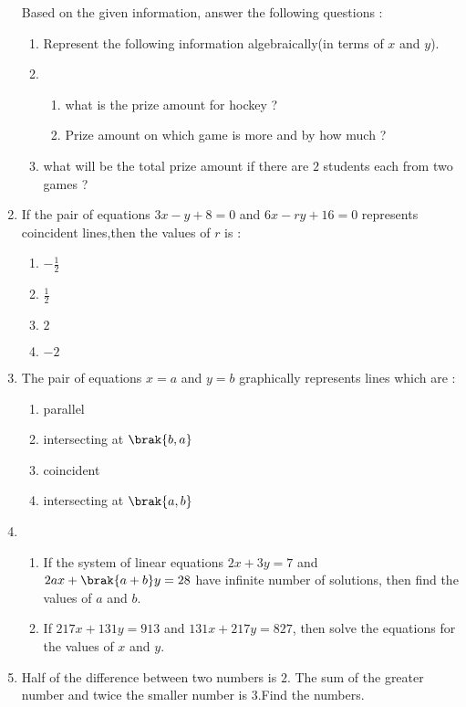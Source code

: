 \begin{enumerate}
Based on the given information, answer the following questions :
\begin{enumerate}[label=(\roman*)]
    \item Represent the following information algebraically(in terms of $x$ and $y$).
    \item\begin{enumerate}[label=(\alph*)]
\item what is the prize amount for hockey ?
\item Prize amount on which game is more and by how much ?
    \end{enumerate}
    \item what will be the total prize amount if there are $2$ students each from two games ?
\end{enumerate}
\item If the pair of equations $3x - y + 8 = 0$ and $6x - ry +16 =0$ represents coincident lines,then the values of $r$ is :
\begin{enumerate}[label=(\alph*)]
    \item $-\frac{1}{2}$
    \item $\frac{1}{2}$
    \item $2$
    \item $-2$
\end{enumerate}
\item The pair of equations $x=a$ and $y=b$ graphically represents lines which are :
\begin{enumerate}[label=(\alph*)]
    \item parallel
    \item intersecting at $\brak{b,a}$
    \item coincident
    \item intersecting at $\brak{a,b}$
\end{enumerate}
\item
\begin{enumerate}[label=(\alph*)]
\item If the system of linear equations 
$2x + 3y = 7$  and   $2ax +\brak{a + b}y =28$ 
have infinite number of solutions, then find the values of $a$ and $b$.
\item  If $217x + 131y = 913$ and  
$131x + 217y = 827$,  then solve the equations for the values of $x$ and $y$.
\end{enumerate}
\item Half of the difference between two numbers is $2$. The sum of the greater number and twice the smaller number is $3$.Find the numbers.
\end{enumerate}
